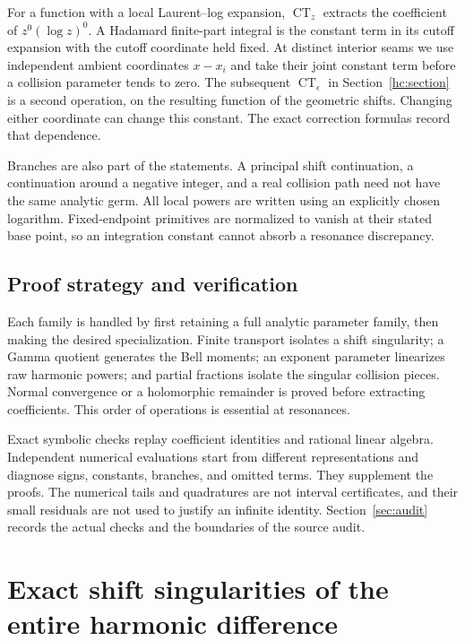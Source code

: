 \documentclass[11pt,a4paper]{article}
\numberwithin{equation}{section}
\theoremstyle{definition}
\theoremstyle{remark}
\DeclareMathOperator{\CT}{CT}
\begin{document}
For a function with a local Laurent--log expansion, $\CT_z$ extracts
the coefficient of $z^0(\log z)^0$. A Hadamard finite-part integral
is the constant term in its cutoff expansion with the cutoff coordinate
held fixed. At distinct interior seams we use independent ambient
coordinates $x-x_i$ and take their joint constant term before a
collision parameter tends to zero. The subsequent $\CT_\epsilon$
in Section~\ref{hc:section} is a second operation, on the resulting
function of the geometric shifts. Changing either coordinate can
change this constant. The exact correction formulas record that
dependence.

Branches are also part of the statements. A principal shift
continuation, a continuation around a negative integer, and a real
collision path need not have the same analytic germ. All local powers
are written using an explicitly chosen logarithm. Fixed-endpoint
primitives are normalized to vanish at their stated base point, so
an integration constant cannot absorb a resonance discrepancy.

\subsection{Proof strategy and verification}

Each family is handled by first retaining a full analytic parameter
family, then making the desired specialization. Finite transport
isolates a shift singularity; a Gamma quotient generates the Bell
moments; an exponent parameter linearizes raw harmonic powers; and
partial fractions isolate the singular collision pieces. Normal
convergence or a holomorphic remainder is proved before extracting
coefficients. This order of operations is essential at resonances.

Exact symbolic checks replay coefficient identities and rational
linear algebra. Independent numerical evaluations start from different
representations and diagnose signs, constants, branches, and omitted
terms. They supplement the proofs. The numerical tails and quadratures
are not interval certificates, and their small residuals are not used
to justify an infinite identity. Section~\ref{sec:audit} records the
actual checks and the boundaries of the source audit.


\section{Exact shift singularities of the entire harmonic difference}
\label{hsh:section}
\end{document}
